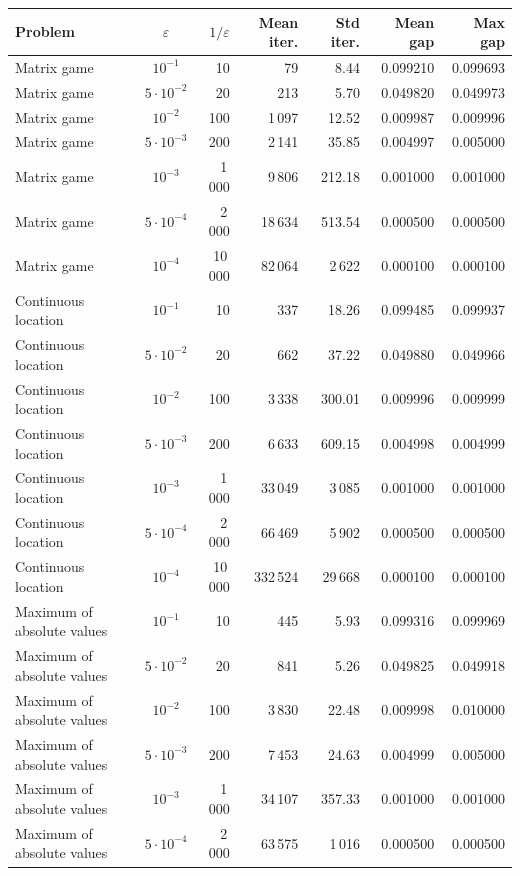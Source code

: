 \begin{tabular}{lcrrrrr}
\toprule
Problem & $\varepsilon$ & $1/\varepsilon$ & Mean iter. & Std iter. & Mean gap & Max gap \\
\midrule
Matrix game & $10^{-1}$ & 10 & 79 & 8.44 & 0.099210 & 0.099693 \\
Matrix game & $5\cdot 10^{-2}$ & 20 & 213 & 5.70 & 0.049820 & 0.049973 \\
Matrix game & $10^{-2}$ & 100 & 1\,097 & 12.52 & 0.009987 & 0.009996 \\
Matrix game & $5\cdot 10^{-3}$ & 200 & 2\,141 & 35.85 & 0.004997 & 0.005000 \\
Matrix game & $10^{-3}$ & 1\,000 & 9\,806 & 212.18 & 0.001000 & 0.001000 \\
Matrix game & $5\cdot 10^{-4}$ & 2\,000 & 18\,634 & 513.54 & 0.000500 & 0.000500 \\
Matrix game & $10^{-4}$ & 10\,000 & 82\,064 & 2\,622 & 0.000100 & 0.000100 \\
Continuous location & $10^{-1}$ & 10 & 337 & 18.26 & 0.099485 & 0.099937 \\
Continuous location & $5\cdot 10^{-2}$ & 20 & 662 & 37.22 & 0.049880 & 0.049966 \\
Continuous location & $10^{-2}$ & 100 & 3\,338 & 300.01 & 0.009996 & 0.009999 \\
Continuous location & $5\cdot 10^{-3}$ & 200 & 6\,633 & 609.15 & 0.004998 & 0.004999 \\
Continuous location & $10^{-3}$ & 1\,000 & 33\,049 & 3\,085 & 0.001000 & 0.001000 \\
Continuous location & $5\cdot 10^{-4}$ & 2\,000 & 66\,469 & 5\,902 & 0.000500 & 0.000500 \\
Continuous location & $10^{-4}$ & 10\,000 & 332\,524 & 29\,668 & 0.000100 & 0.000100 \\
Maximum of absolute values & $10^{-1}$ & 10 & 445 & 5.93 & 0.099316 & 0.099969 \\
Maximum of absolute values & $5\cdot 10^{-2}$ & 20 & 841 & 5.26 & 0.049825 & 0.049918 \\
Maximum of absolute values & $10^{-2}$ & 100 & 3\,830 & 22.48 & 0.009998 & 0.010000 \\
Maximum of absolute values & $5\cdot 10^{-3}$ & 200 & 7\,453 & 24.63 & 0.004999 & 0.005000 \\
Maximum of absolute values & $10^{-3}$ & 1\,000 & 34\,107 & 357.33 & 0.001000 & 0.001000 \\
Maximum of absolute values & $5\cdot 10^{-4}$ & 2\,000 & 63\,575 & 1\,016 & 0.000500 & 0.000500 \\

\end{tabular}
